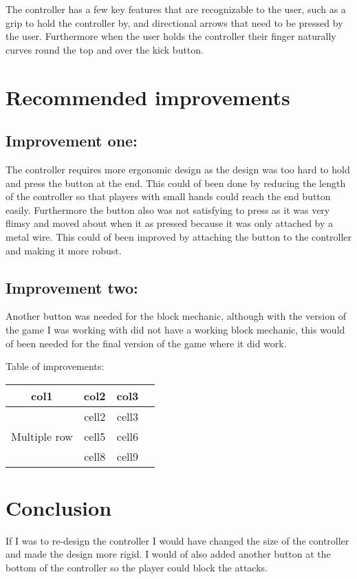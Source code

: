 \documentclass{scrartcl}
\begin{document}
The controller has a few key features that are recognizable to the user, such as a grip to hold the controller by, and directional arrows that need to be pressed by the user. Furthermore when the user holds the controller their finger naturally curves round the top and over the kick button.







\section{Recommended improvements}

\subsection{Improvement one:}
The controller requires more ergonomic design as the design was too hard to hold and press the button at the end. This could of been done by reducing the length of the controller so that players with small hands could reach the end button easily. Furthermore the button also was not satisfying to press as it was very flimsy and moved about when it as pressed because it was only attached by a metal wire. This could of been improved by attaching the button to the controller and making it more robust.

\subsection{Improvement two:}
Another button was needed for the block mechanic, although with the version of the game I was working with did not have a working block mechanic, this would of been needed for the final version of the game where it did work.


Table of improvements:
\begin{center}
\begin{tabular}{ |c|c|c|c| } 
\hline
col1 & col2 & col3 \\
\hline
\multirow{3}{4em}{Multiple row} & cell2 & cell3 \\ 
& cell5 & cell6 \\ 
& cell8 & cell9 \\ 
\hline
\end{tabular}
\end{center}


\section{Conclusion}

If I was to re-design the controller I would have changed the size of the controller and made the design more rigid. I would of also added another button at the bottom of the controller so the player could block the attacks.



\end{document}
